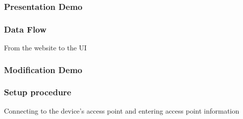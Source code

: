\documentclass{beamer}
\begin{document}
\frame{\titlepage}

\begin{frame}
  \frametitle{Presentation Demo}

  

\end{frame}

\begin{frame}
  \frametitle{Data Flow}

  From the website to the UI
\end{frame}

\begin{frame}
  \frametitle{Modification Demo}

\end{frame}

\begin{frame}
  \frametitle{Setup procedure}

  Connecting to the device's access point and entering access point information
\end{frame}
\end{document}
